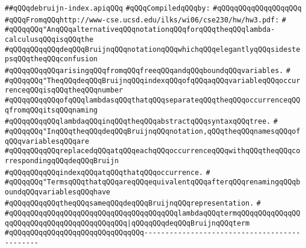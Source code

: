 \label{src/lib/compiler/front/typer/basics/debruijn-index.api}
\verb|##qQQqdebruijn-index.apiqQQq|\newline
\newline
\verb|#qQQqCompiledqQQqby:|\newline
\verb|#qQQqqQQqqQQqqQQqqQQq|\newline
\newline
\verb|#qQQqFromqQQqhttp://www-cse.ucsd.edu/ilks/wi06/cse230/hw/hw3.pdf:|\newline
\verb|#|\newline
\verb|#qQQqqQQq"AnqQQqalternativeqQQqnotationqQQqforqQQqtheqQQqlambda-calculusqQQqisqQQqthe|\newline
\verb|#qQQqqQQqqQQqdeqQQqBruijnqQQqnotationqQQqwhichqQQqelegantlyqQQqsidestepsqQQqtheqQQqconfusion|\newline
\verb|#qQQqqQQqqQQqarisingqQQqfromqQQqfreeqQQqandqQQqboundqQQqvariables.|\newline
\verb|#|\newline
\verb|#qQQqqQQq"TheqQQqdeqQQqBruijnqQQqindexqQQqofqQQqaqQQqvariableqQQqoccurrenceqQQqisqQQqtheqQQqnumber|\newline
\verb|#qQQqqQQqqQQqofqQQqlambdasqQQqthatqQQqseparateqQQqtheqQQqoccurrenceqQQqfromqQQqitsqQQqnaming|\newline
\verb|#qQQqqQQqqQQqlambdaqQQqinqQQqtheqQQqabstractqQQqsyntaxqQQqtree.|\newline
\verb|#|\newline
\verb|#qQQqqQQq"InqQQqtheqQQqdeqQQqBruijnqQQqnotation,qQQqtheqQQqnamesqQQqofqQQqvariablesqQQqare|\newline
\verb|#qQQqqQQqqQQqreplacedqQQqatqQQqeachqQQqoccurrenceqQQqwithqQQqtheqQQqcorrespondingqQQqdeqQQqBruijn|\newline
\verb|#qQQqqQQqqQQqindexqQQqatqQQqthatqQQqoccurrence.|\newline
\verb|#|\newline
\verb|#qQQqqQQq"TermsqQQqthatqQQqareqQQqequivalentqQQqafterqQQqrenamingqQQqboundqQQqvariablesqQQqhave|\newline
\verb|#qQQqqQQqqQQqtheqQQqsameqQQqdeqQQqBruijnqQQqrepresentation.|\newline
\verb|#|\newline
\verb|#qQQqqQQqqQQqqQQqqQQqqQQqqQQqqQQqqQQqqQQqlambdaqQQqtermqQQqqQQqqQQqqQQqqQQqqQQqqQQqqQQqqQQqqQQqqQQq|\verb#|qQQqqQQqdeqQQqBruijnqQQqterm#\newline
\verb|#qQQqqQQqqQQqqQQqqQQqqQQqqQQqqQQq---------------------------------------------|\newline

